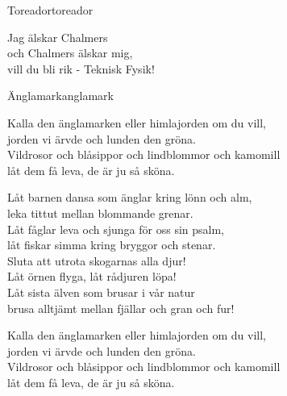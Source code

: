 \begin{song}{Toreador}{toreador}
\begin{vers}
Jag älskar Chalmers\\
och Chalmers älskar mig,\\
vill du bli rik - Teknisk Fysik!\\
\end{vers}
\end{song}

\newpage

\begin{song}{Änglamark}{anglamark}
\begin{vers}
Kalla den änglamarken eller himlajorden om du vill,\\
jorden vi ärvde och lunden den gröna.\\
Vildrosor och blåsippor och lindblommor och kamomill\\
låt dem få leva, de är ju så sköna.\\
\end{vers}
\begin{vers}
Låt barnen dansa som änglar kring lönn och alm,\\
leka tittut mellan blommande grenar.\\
Låt fåglar leva och sjunga för oss sin psalm,\\
låt fiskar simma kring bryggor och stenar.\\
Sluta att utrota skogarnas alla djur!\\
Låt örnen flyga, låt rådjuren löpa!\\
Låt sista älven som brusar i vår natur\\
brusa alltjämt mellan fjällar och gran och fur!\\
\end{vers}
\begin{vers}
Kalla den änglamarken eller himlajorden om du vill,\\
jorden vi ärvde och lunden den gröna.\\
Vildrosor och blåsippor och lindblommor och kamomill\\
låt dem få leva, de är ju så sköna.\\
\end{vers}
\end{song}

\newpage

